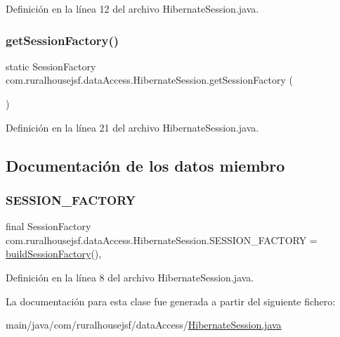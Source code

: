 Definición en la línea 12 del archivo Hibernate\+Session.\+java.

\mbox{\label{a00152_ac3420369289a3eb4051f880815d4b5c1}} 
\subsubsection{\texorpdfstring{getSessionFactory()}{getSessionFactory()}}
{\footnotesize\ttfamily static Session\+Factory com.\+ruralhousejsf.\+data\+Access.\+Hibernate\+Session.\+get\+Session\+Factory (\begin{DoxyParamCaption}{ }\end{DoxyParamCaption})\hspace{0.3cm}{\ttfamily [static]}}



Definición en la línea 21 del archivo Hibernate\+Session.\+java.



\subsection{Documentación de los datos miembro}
\mbox{\label{a00152_abb795a9ae4989d1caa92621d53529fe1}} 
\subsubsection{\texorpdfstring{SESSION\_FACTORY}{SESSION\_FACTORY}}
{\footnotesize\ttfamily final Session\+Factory com.\+ruralhousejsf.\+data\+Access.\+Hibernate\+Session.\+S\+E\+S\+S\+I\+O\+N\+\_\+\+F\+A\+C\+T\+O\+RY = \mbox{\hyperlink{a00152_a54c628cf25032f8511a199671e73820d}{build\+Session\+Factory}}()\hspace{0.3cm}{\ttfamily [static]}, {\ttfamily [private]}}



Definición en la línea 8 del archivo Hibernate\+Session.\+java.



La documentación para esta clase fue generada a partir del siguiente fichero\+:\begin{DoxyCompactItemize}
\item 
main/java/com/ruralhousejsf/data\+Access/\mbox{\hyperlink{a00020}{Hibernate\+Session.\+java}}\end{DoxyCompactItemize}
